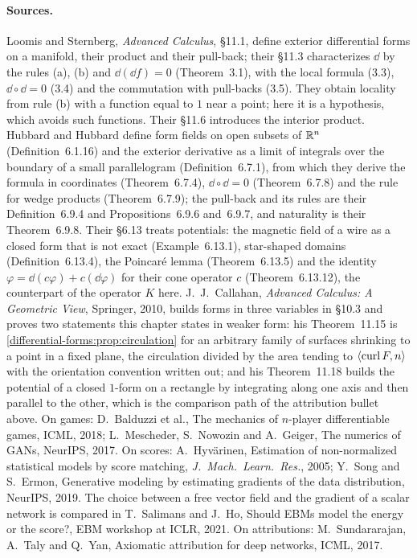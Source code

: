 \begin{notechapter}
\paragraph{Sources.} Loomis and Sternberg, \emph{Advanced Calculus},
\S11.1, define exterior differential forms on a manifold, their
product and their pull-back; their \S11.3 characterizes $\dd$ by the
rules (a), (b) and $\dd(\dd f) = 0$ (Theorem~3.1), with the local
formula (3.3), $\dd\circ\dd = 0$ (3.4) and the commutation with
pull-backs (3.5). They obtain locality from rule (b) with a function
equal to $1$ near a point; here it is a hypothesis, which avoids such
functions. Their \S11.6 introduces the interior product. Hubbard and
Hubbard define form fields on open subsets of $\mathbb{R}^n$
(Definition~6.1.16) and the exterior derivative as a limit of integrals
over the boundary of a small parallelogram (Definition~6.7.1), from
which they derive the formula in coordinates (Theorem~6.7.4),
$\dd\circ\dd = 0$ (Theorem~6.7.8) and the rule for wedge products
(Theorem~6.7.9); the pull-back and its rules are their Definition~6.9.4
and Propositions~6.9.6 and~6.9.7, and naturality is their Theorem~6.9.8.
Their \S6.13 treats potentials: the magnetic field of a wire as a
closed form that is not exact (Example~6.13.1), star-shaped domains
(Definition~6.13.4), the Poincar\'e lemma (Theorem~6.13.5) and the
identity $\varphi = \dd(c\varphi) + c(\dd\varphi)$ for their cone
operator $c$ (Theorem~6.13.12), the counterpart of the operator $K$
here. J.~J.~Callahan, \emph{Advanced Calculus: A Geometric View},
Springer, 2010, builds forms in three variables in \S10.3 and proves
two statements this chapter states in weaker form: his Theorem~11.15 is
\cref{differential-forms:prop:circulation} for an arbitrary family of
surfaces shrinking to a point in a fixed plane, the circulation divided
by the area tending to $\left\langle \operatorname{curl}F, n \right\rangle$ with the
orientation convention written out; and his Theorem~11.18 builds the
potential of a closed $1$-form on a rectangle by integrating along one
axis and then parallel to the other, which is the comparison path of
the attribution bullet above. On
games: D.~Balduzzi et al., The mechanics of $n$-player differentiable
games, ICML, 2018; L.~Mescheder, S.~Nowozin and A.~Geiger, The numerics
of GANs, NeurIPS, 2017. On scores: A.~Hyv\"arinen, Estimation of
non-normalized statistical models by score matching, \emph{J.\ Mach.\
Learn.\ Res.}, 2005; Y.~Song and S.~Ermon, Generative modeling by
estimating gradients of the data distribution, NeurIPS, 2019. The
choice between a free vector field and the gradient of a scalar network
is compared in T.~Salimans and J.~Ho, Should EBMs model the energy or
the score?, EBM workshop at ICLR, 2021. On
attributions: M.~Sundararajan, A.~Taly and Q.~Yan, Axiomatic
attribution for deep networks, ICML, 2017.


\end{notechapter}
